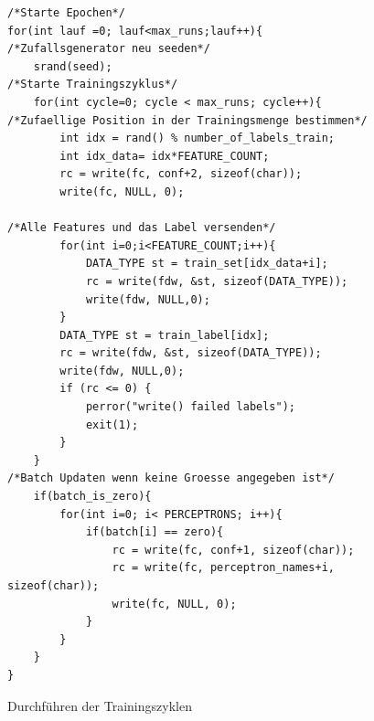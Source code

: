\begin{figure}
\centering
\begin{lstlisting}
/*Starte Epochen*/
for(int lauf =0; lauf<max_runs;lauf++){
/*Zufallsgenerator neu seeden*/
	srand(seed);
/*Starte Trainingszyklus*/
	for(int cycle=0; cycle < max_runs; cycle++){
/*Zufaellige Position in der Trainingsmenge bestimmen*/
		int idx = rand() % number_of_labels_train;
		int idx_data= idx*FEATURE_COUNT;
		rc = write(fc, conf+2, sizeof(char));
		write(fc, NULL, 0);

/*Alle Features und das Label versenden*/
		for(int i=0;i<FEATURE_COUNT;i++){
			DATA_TYPE st = train_set[idx_data+i];
			rc = write(fdw, &st, sizeof(DATA_TYPE));
			write(fdw, NULL,0);
		}
		DATA_TYPE st = train_label[idx];
		rc = write(fdw, &st, sizeof(DATA_TYPE));
		write(fdw, NULL,0);
	    if (rc <= 0) {
	    	perror("write() failed labels");
	        exit(1);
	    }
	}
/*Batch Updaten wenn keine Groesse angegeben ist*/
	if(batch_is_zero){
		for(int i=0; i< PERCEPTRONS; i++){
			if(batch[i] == zero){
				rc = write(fc, conf+1, sizeof(char));
				rc = write(fc, perceptron_names+i, sizeof(char));
				write(fc, NULL, 0);
			}
		}
	}
}
\end{lstlisting}
\caption{Durchführen der Trainingszyklen}
\end{figure}\newpage


